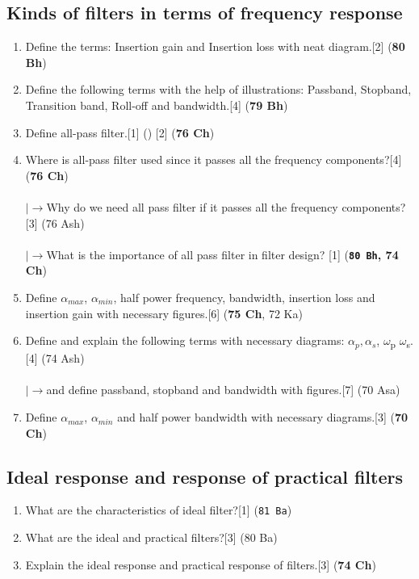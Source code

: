 \documentclass[12pt]{article}
\newcommand{\w}{\(\omega\)}
\newcommand{\lb}{\\$\left|\rightarrow\right.$}
\begin{document}
\subsection{Kinds of filters in terms of frequency response}
\begin{enumerate}
\item Define the terms: Insertion gain and Insertion loss with neat diagram.\hfill[2] (\textbf{80 Bh})
\item Define the following terms with the help of illustrations: Passband, Stopband, Transition band, Roll-off and bandwidth.\hfill[4] (\textbf{79 Bh})
\item Define all-pass filter.\hfill[1] () [2] (\textbf{76 Ch})
\item Where is all-pass filter used since it passes all the frequency components?\hfill[4] (\textbf{76 Ch})\\
\lb Why do we need all pass filter if it passes all the frequency components?\hfill[3] (76 Ash)\\
\lb  What is the importance of all pass filter in filter design? \hfill [1] (\textbf{\texttt{80 Bh}, 74 Ch})
\item Define $\alpha_{max}$, $\alpha_{min}$, half power frequency, bandwidth, insertion loss and insertion gain with necessary figures.\hfill[6] (\textbf{75 Ch}, 72 Ka)
\item Define and explain the following terms with necessary diagrams: $\alpha_p, \alpha_s$, \w\textsubscript{p} \w\textsubscript{s}.\hfill[4] (74 Ash)\\
\lb and define passband, stopband and bandwidth with figures.\hfill[7] (70 Asa)
\item Define $\alpha_{max}$, $\alpha_{min}$ and half power bandwidth with necessary diagrams.\hfill[3] (\textbf{70 Ch})
\end{enumerate}
\subsection{Ideal response and response of practical filters}
\begin{enumerate}
\item What are the characteristics of ideal filter?\hfill[1] (\texttt{81 Ba})
\item What are the ideal and practical filters?\hfill[3] (80 Ba)
\item Explain the ideal response and practical response of filters.\hfill[3] (\textbf{74 Ch})
\end{enumerate}
\end{document}
